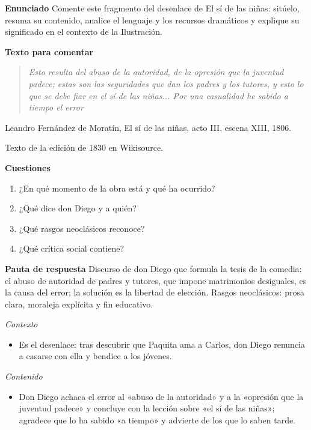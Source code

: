 \documentclass{book}
\begin{document}
\begin{tcolorbox}[title={Ejercicio resuelto}, studiumworked, breakable]

\noindent\textbf{Enunciado}
Comente este fragmento del desenlace de El sí de las niñas: sitúelo, resuma su contenido, analice el lenguaje y los recursos dramáticos y explique su significado en el contexto de la Ilustración.


\noindent\textbf{Texto para comentar}

\begin{quote}
\itshape Esto resulta del abuso de la autoridad, de la opresión que la juventud padece; estas son las seguridades que dan los padres y los tutores, y esto lo que se debe fiar en el sí de las niñas... Por una casualidad he sabido a tiempo el error
\end{quote}
{\noindent\footnotesize Leandro Fernández de Moratín, El sí de las niñas, acto III, escena XIII, 1806.\par}
{\noindent\footnotesize Texto de la edición de 1830 en Wikisource.\par}

\noindent\textbf{Cuestiones}
\begin{enumerate}
\item ¿En qué momento de la obra está y qué ha ocurrido?
\item ¿Qué dice don Diego y a quién?
\item ¿Qué rasgos neoclásicos reconoce?
\item ¿Qué crítica social contiene?
\end{enumerate}

\noindent\textbf{Pauta de respuesta}
Discurso de don Diego que formula la tesis de la comedia: el abuso de autoridad de padres y tutores, que impone matrimonios desiguales, es la causa del error; la solución es la libertad de elección. Rasgos neoclásicos: prosa clara, moraleja explícita y fin educativo.


\noindent\textit{Contexto}
\begin{itemize}
\item Es el desenlace: tras descubrir que Paquita ama a Carlos, don Diego renuncia a casarse con ella y bendice a los jóvenes.
\end{itemize}

\noindent\textit{Contenido}
\begin{itemize}
\item Don Diego achaca el error al «abuso de la autoridad» y a la «opresión que la juventud padece» y concluye con la lección sobre «el sí de las niñas»; agradece que lo ha sabido «a tiempo» y advierte de los que lo saben tarde.
\end{itemize}


\end{tcolorbox}
\end{document}
